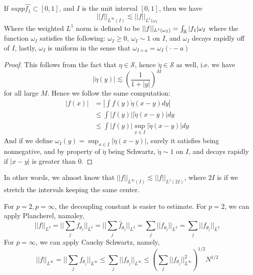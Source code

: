 \begin{proposition}
    If $supp\widehat{f_1}\subset[0,1]$, and $I$ is the unit interval $[0,1]$, then we have
    \begin{equation*}
        ||f||_{L^\infty(I)}\lesssim ||f||_{L^1(\omega_I}
    \end{equation*}
    Where the weighted $L^1$ norm is defined to be $||f||_{L^1(\omega_I)}=\int_{\mathbb{R}}|f_1|\omega_I$
    where the function $\omega_I$ satisfies the following: $\omega_I\geq 0$, $\omega_I\sim 1$ on $I$, and $\omega_I$ decays rapidly off of $I$, lastly, $\omega_I$ is uniform in the sense that $\omega_{I+a}=\omega_I(\cdot-a)$
\end{proposition}
\begin{proof}
    This follows from the fact that $\eta\in\mathcal{S}$, hence $\check{\eta}\in\mathcal{S}$ as well, i.e. we have
    \begin{equation*}
        |\check{\eta}(y)|\lesssim \left(\frac{1}{1+|y|}\right)^{M}
    \end{equation*}
    for all large $M$.
Hence we follow the same computation:
\begin{align*}
    |f(x)|&=\left|\int f(y)\check{\eta}(x-y)dy \right|\\
    &\leq \int|f(y)||\check{\eta}(x-y)|dy\\
    &\leq \int|f(y)|\sup_{x\in I}|\check{\eta}(x-y)|dy
\end{align*}
And if we define $\omega_I(y)=\sup_{x\in I}|\check{\eta}(x-y)|$, surely it  satisfies being nonnegative, and by property of $\check{\eta}$ being Schwartz, $\check{\eta}\sim 1$ on $I$, and decays rapidly if $|x-y|$ is greater than 0.
\end{proof}
In other words, we almost know that 
$||f||_{L^\infty(I)}\lesssim ||f||_{L^1(2I)}$, where $2I$ is if we stretch the intervals keeping the same center.

\begin{remark}
    For $p=2, p=\infty$, the decoupling constant is easier to estimate. For $p=2$, we can apply Plancherel, namaley,
    \begin{equation*}
        ||f||_{L^2}=||\sum_jf_{\theta_j}||_{L^2}=||\sum_j\widehat{f}_{\theta_j}||_{L^2}=\sum_j||f_{\theta_j}||_{L^2}=\sum_{j}||f_{\theta_j}||_{L^2}
    \end{equation*}
    For $p=\infty$, we can apply Cauchy Schwartz, namely,
    \begin{equation*}
        ||f||_{L^\infty}=||\sum_jf_{\theta_j}||_{L^\infty}\leq\sum_j||f_{\theta_j}||_{L^\infty}\leq\left(\sum_j||f_{\theta_j}||_{L^\infty}^2\right)^{1/2}N^{1/2}
    \end{equation*}
\end{remark}


